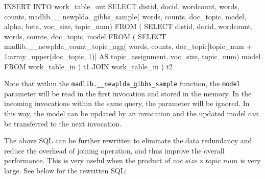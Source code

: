 \begin{sql}[emph={work_table_out,work_table_in,__newplda_gibbs_sample,__newplda_count_topic_agg,model}]
    INSERT INTO work_table_out
    SELECT
        distid,
        docid,
        wordcount,
        words,
        counts,
        madlib.__newplda_gibbs_sample(
            words,
            counts,
            doc_topic,
            model,
            alpha,
            beta,
            voc_size,
            topic_num)
    FROM
    (
        SELECT
            distid,
            docid,
            wordcount,
            words,
            counts,
            doc_topic,
            model
        FROM
        (
            SELECT
                madlib.__newplda_count_topic_agg(
                    words,
                    counts,
                    doc_topic[topic_num + 1:array_upper(doc_topic, 1)]
                                    AS topic_assignment,
                    voc_size,
                    topic_num) model
            FROM
                work_table_in
        ) t1
        JOIN
        work_table_in
    ) t2
\end{sql}

Note that within the \texttt{madlib.\_\_newplda\_gibbs\_sample} function, the \texttt{model} parameter will be read in the first invocation and stored in the memory. In the incoming invocations within the same query, the parameter will be ignored. In this way, the model can be updated by an invocation and the updated model can be transferred to the next invocation.

The above SQL can be further rewritten to eliminate the data redundancy and reduce the overhead of joining operation, and thus improve the overall performance. This is very useful when the product of $voc\_size \times topic\_num$ is very large. See below for the rewritten SQL:

